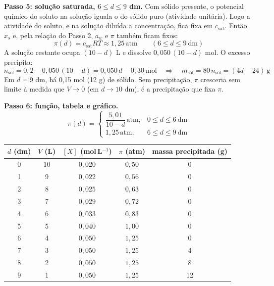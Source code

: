 \documentclass{article}%
\begin{document}
\textbf{Passo 5: solução saturada, $6\le d\le 9$ dm.} Com sólido presente, o potencial químico do soluto na solução iguala o do sólido puro (atividade unitária). Logo a atividade do soluto, e na solução diluída a concentração, fica fixa em $c_{\mathrm{sat}}$. Então $x_s$ e, pela relação do Passo 2, $a_w$ e $\pi$ também ficam fixos:
\[
\pi(d)=c_{\mathrm{sat}}RT\approx 1{,}25\,\mathrm{atm}\qquad(6\le d\le 9\ \mathrm{dm})
\]
A solução restante ocupa $(10-d)$ L e dissolve $0{,}050\,(10-d)$ mol. O excesso precipita:
\[
n_{\mathrm{sól}}=0{,}2-0{,}050\,(10-d)=0{,}050\,d-0{,}30\ \mathrm{mol}\quad\Rightarrow\quad m_{\mathrm{sól}}=80\,n_{\mathrm{sól}}=(4d-24)\ \mathrm{g}
\]
Em $d=9$ dm, há 0,15 mol (12 g) de sólido. Sem precipitação, $\pi$ cresceria sem limite à medida que $V\to 0$ (em $d\to 10$ dm); é a precipitação que fixa $\pi$.

\textbf{Passo 6: função, tabela e gráfico.}
\[
\pi(d)=
\begin{cases}
\dfrac{5{,}01}{10-d}\,\mathrm{atm}, & 0\le d\le 6\ \mathrm{dm}\\[2ex]
1{,}25\,\mathrm{atm}, & 6\le d\le 9\ \mathrm{dm}
\end{cases}
\]

\begin{center}
\begin{tabular}{|c|c|c|c|c|}
\hline
$d$ (dm) & $V$ (L) & $[X]$ (mol\,L$^{-1}$) & $\pi$ (atm) & massa precipitada (g) \\
\hline
0 & 10 & $0{,}020$ & $0{,}50$ & 0 \\
1 & 9 & $0{,}022$ & $0{,}56$ & 0 \\
2 & 8 & $0{,}025$ & $0{,}63$ & 0 \\
3 & 7 & $0{,}029$ & $0{,}72$ & 0 \\
4 & 6 & $0{,}033$ & $0{,}83$ & 0 \\
5 & 5 & $0{,}040$ & $1{,}00$ & 0 \\
6 & 4 & $0{,}050$ & $1{,}25$ & 0 \\
7 & 3 & $0{,}050$ & $1{,}25$ & 4 \\
8 & 2 & $0{,}050$ & $1{,}25$ & 8 \\
9 & 1 & $0{,}050$ & $1{,}25$ & 12 \\
\hline
\end{tabular}
\end{center}
\end{document}
